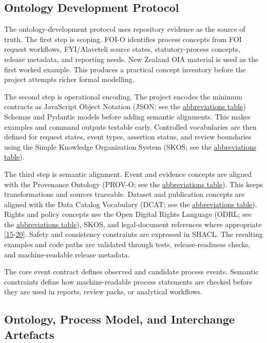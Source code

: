 \documentclass[
]{article}
\begin{document}
\subsection{Ontology Development
Protocol}\label{ontology-development-protocol}

The ontology-development protocol uses repository evidence as the source
of truth. The first step is scoping. FOI-O identifies process concepts
from FOI request workflows, FYI/Alaveteli source states,
statutory-process concepts, release metadata, and reporting needs. New
Zealand OIA material is used as the first worked example. This produces
a practical concept inventory before the project attempts richer formal
modelling.

The second step is operational encoding. The project encodes the minimum
contracts as JavaScript Object Notation (JSON; see the
\hyperlink{tab-abbreviations}{abbreviations table}) Schemas and Pydantic
models before adding semantic alignments. This makes examples and
command outputs testable early. Controlled vocabularies are then defined
for request states, event types, assertion status, and review boundaries
using the Simple Knowledge Organization System (SKOS; see the
\hyperlink{tab-abbreviations}{abbreviations table}).

The third step is semantic alignment. Event and evidence concepts are
aligned with the Provenance Ontology (PROV-O; see the
\hyperlink{tab-abbreviations}{abbreviations table}). This keeps
transformations and sources traceable. Dataset and publication concepts
are aligned with the Data Catalog Vocabulary (DCAT; see the
\hyperlink{tab-abbreviations}{abbreviations table}). Rights and policy
concepts use the Open Digital Rights Language (ODRL; see the
\hyperlink{tab-abbreviations}{abbreviations table}), SKOS, and
legal-document references where appropriate {[}\hyperlink{ref-15}{15}-\hyperlink{ref-20}{20}{]}. Safety and
consistency constraints are expressed in SHACL. The resulting examples
and code paths are validated through tests, release-readiness checks,
and machine-readable release metadata.

The core event contract defines observed and candidate process events.
Semantic constraints define how machine-readable process statements are
checked before they are used in reports, review packs, or analytical
workflows.

\subsection{Ontology, Process Model, and Interchange
Artefacts}\label{ontology-process-model-and-interchange-artefacts}
\end{document}
